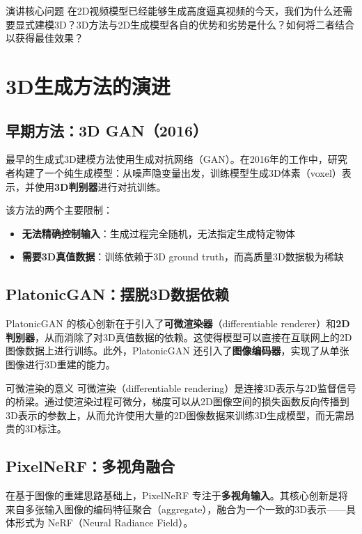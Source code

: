 \documentclass[a4paper]{article}
\begin{document}
\begin{importantbox}{演讲核心问题}
在2D视频模型已经能够生成高度逼真视频的今天，我们为什么还需要显式建模3D？3D方法与2D生成模型各自的优势和劣势是什么？如何将二者结合以获得最佳效果？
\end{importantbox}

\section{3D生成方法的演进}

\subsection{早期方法：3D GAN（2016）}

最早的生成式3D建模方法使用生成对抗网络（GAN）。在2016年的工作中，研究者构建了一个纯生成模型：从噪声隐变量出发，训练模型生成3D体素（voxel）表示，并使用\textbf{3D判别器}进行对抗训练。

该方法的两个主要限制：
\begin{itemize}
    \item \textbf{无法精确控制输入}：生成过程完全随机，无法指定生成特定物体
    \item \textbf{需要3D真值数据}：训练依赖于3D ground truth，而高质量3D数据极为稀缺
\end{itemize}

\subsection{PlatonicGAN：摆脱3D数据依赖}

PlatonicGAN 的核心创新在于引入了\textbf{可微渲染器}（differentiable renderer）和\textbf{2D判别器}，从而消除了对3D真值数据的依赖。这使得模型可以直接在互联网上的2D图像数据上进行训练。此外，PlatonicGAN 还引入了\textbf{图像编码器}，实现了从单张图像进行3D重建的能力。

\begin{knowledgebox}{可微渲染的意义}
可微渲染（differentiable rendering）是连接3D表示与2D监督信号的桥梁。通过使渲染过程可微分，梯度可以从2D图像空间的损失函数反向传播到3D表示的参数上，从而允许使用大量的2D图像数据来训练3D生成模型，而无需昂贵的3D标注。
\end{knowledgebox}

\subsection{PixelNeRF：多视角融合}

在基于图像的重建思路基础上，PixelNeRF 专注于\textbf{多视角输入}。其核心创新是将来自多张输入图像的编码特征聚合（aggregate），融合为一个一致的3D表示——具体形式为 NeRF（Neural Radiance Field）。
\end{document}
